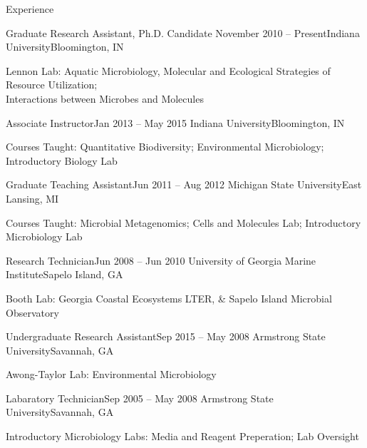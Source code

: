 \documentclass{resume} %
\begin{document}
\begin{rSection}{Experience}

  \begin{rSubsection}{Graduate Research Assistant, Ph.D. Candidate}
    {November 2010 -- Present}{Indiana University}{Bloomington, IN}
    \item Lennon Lab: Aquatic Microbiology, Molecular and Ecological Strategies
                      of Resource Utilization; \\
                      Interactions between Microbes and Molecules
  \end{rSubsection}

  \begin{rSubsection}{Associate Instructor}{Jan 2013 -- May 2015}
    {Indiana University}{Bloomington, IN}
    \item Courses Taught: Quantitative Biodiversity; Environmental Microbiology;
                          Introductory Biology Lab
  \end{rSubsection}

  \begin{rSubsection}{Graduate Teaching Assistant}{Jun 2011 -- Aug 2012}
    {Michigan State University}{East Lansing, MI}
    \item Courses Taught: Microbial Metagenomics; Cells and Molecules Lab;
                          Introductory Microbiology Lab
  \end{rSubsection}

  \begin{rSubsection}{Research Technician}{Jun 2008 -- Jun 2010}
    {University of Georgia Marine Institute}{Sapelo Island, GA}
    \item Booth Lab: Georgia Coastal Ecosystems LTER, \& Sapelo Island Microbial
                     Observatory
  \end{rSubsection}

  \begin{rSubsection}{Undergraduate Research Assistant}{Sep 2015 -- May 2008}
    {Armstrong State University}{Savannah, GA}
    \item Awong-Taylor Lab: Environmental Microbiology
  \end{rSubsection}

  \begin{rSubsection}{Labaratory Technician}{Sep 2005 -- May 2008}
    {Armstrong State University}{Savannah, GA}
    \item Introductory Microbiology Labs: Media and Reagent Preperation;
                                          Lab Oversight
  \end{rSubsection}

\end{rSection}
\end{document}
